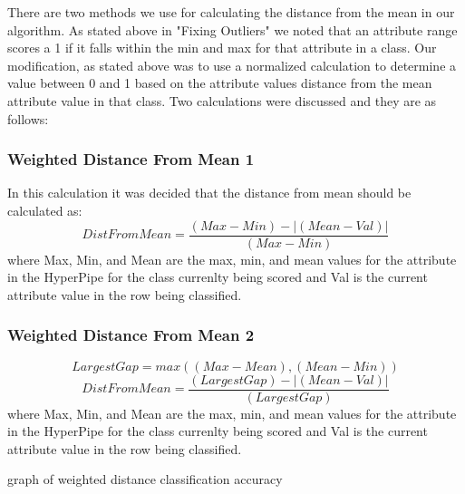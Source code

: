There are two methods we use for calculating the distance from 
the mean in our algorithm. As stated above in "Fixing Outliers" 
we noted that an attribute range scores a 1 if it falls within 
the min and max for that attribute in a class. Our modification, 
as stated above was to use a normalized calculation to determine 
a value between 0 and 1 based on the attribute values distance 
from the mean attribute value in that class. Two calculations 
were discussed and they are as follows:
\subsubsection{Weighted Distance From Mean 1}
In this calculation it was decided that the distance from mean 
should be calculated as:
\begin{equation}
  DistFromMean=\frac{(Max-Min)-|(Mean-Val)|}{(Max-Min)}
\end{equation}
where Max, Min, and Mean are the max, min, and mean values for 
the attribute in the HyperPipe for the class currenlty being 
scored and Val is the current attribute value in the row being 
classified. 
\subsubsection{Weighted Distance From Mean 2}
\begin{equation}
  LargestGap = max((Max-Mean),(Mean-Min))
\end{equation}
\begin{equation}
  DistFromMean=\frac{(LargestGap)-|(Mean-Val)|}{(LargestGap)}
\end{equation}
where Max, Min, and Mean are the max, min, and mean values for 
the attribute in the HyperPipe for the class currenlty being 
scored and Val is the current attribute value in the row being 
classified.



graph of weighted distance classification accuracy

